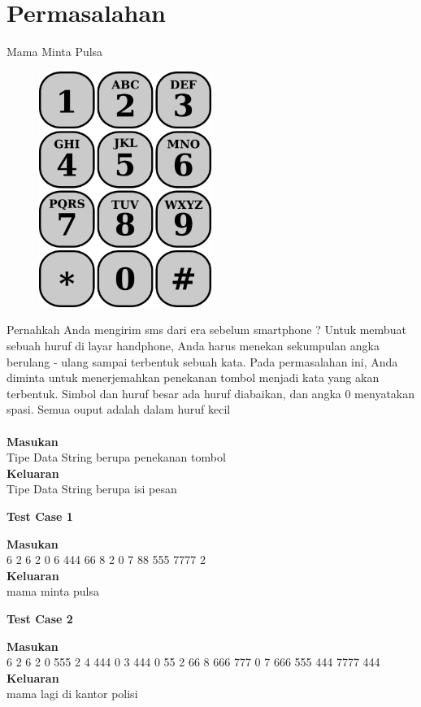 \section{Permasalahan}
\begin{permasalahan}{Mama Minta Pulsa}\\
\label{prob:MamaMintaPulsa}
			\begin{figure}[h!]
			\centering
			\includegraphics[width=0.5\textwidth]{fig/JamPasir/keypad.png}	
			\end{figure}
	Pernahkah Anda mengirim sms dari era sebelum smartphone ? Untuk membuat sebuah huruf di layar handphone, Anda harus menekan sekumpulan angka berulang - ulang sampai terbentuk sebuah kata. Pada permasalahan ini, Anda diminta untuk menerjemahkan penekanan tombol menjadi kata yang akan terbentuk. Simbol dan huruf besar ada huruf diabaikan, dan angka 0 menyatakan spasi. Semua ouput adalah dalam huruf kecil\\\\
	\textbf{Masukan}\\
	Tipe Data String berupa penekanan tombol\\
	\textbf{Keluaran}\\
	Tipe Data String berupa isi pesan
	\begin{center}
	\textbf{Test Case 1}\\
	\end{center}
	\textbf{Masukan}\\
	6 2 6 2 0 6 444 66 8 2 0 7 88 555 7777 2\\
	\textbf{Keluaran}\\
	mama minta pulsa
	
	\begin{center}
	\textbf{Test Case 2}\\
	\end{center}
	\textbf{Masukan}\\
	6 2 6 2 0 555 2 4 444 0 3 444 0 55 2 66 8 666 777 0 7 666 555 444 7777 444\\
	\textbf{Keluaran}\\
	mama lagi di kantor polisi
	

\end{permasalahan}
